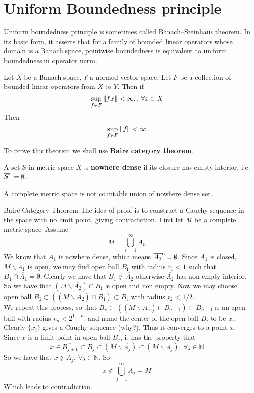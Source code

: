 \newpage
\section{Uniform Boundedness principle}
Uniform boundedness principle is sometimes called Banach–Steinhaus theorem. In its basic form, it asserts that for a family of bounded linear operators  whose domain is a Banach space, pointwise boundedness is equivalent to uniform boundedness in operator norm.

\begin{theorem}\rm\nextline
	Let $X$ be a Banach space, $Y$ a normed vector space. Let $F$ be a collection of bounded linear operators from $X$ to $Y$. Then if
	$$
		\sup_{f\in F}\left\|{fx}\right\|<\infty,,\,\forall x\in X
	$$
	Then
	$$
		\sup_{f\in F}\left\|{f}\right\|<\infty
	$$
\end{theorem}
To prove this theorem we shall use {\textbf{Baire category theorem}}.

\begin{definition}\rm\nextline
	A set $S$ in metric space $X$ is {\bf nowhere dense} if its closure has empty interior. i.e. $\overline{S}\strut^\mathrm{o}=\emptyset$.
\end{definition}

\begin{theorem}\rm\nextline
	A complete metric space is not countable union of nowhere dense set.
\begin{pf}{Baire Category Theorem}{}
	The idea of proof is to construct a Cauchy sequence in the space with no limit point, giving contradiction. First let $M$ be a complete metric space. Assume
	$$M=\bigcup_{n=1}^\infty A_n$$
	We know that $A_1$ is nowhere dense, which means $\overline{A_1}\strut^\mathrm{o}=\emptyset$. Since $\overline{A_1}$ is closed, $M\backslash \overline{A_1}$ is open, we may find open ball $B_1$ with radius $r_1<1$ such that $B_1\cap\overline{A_1}=\emptyset$. Clearly we have that $B_1\not\subset\overline{A_2}$ otherwise $\overline{A_2}$ has non-empty interior. So we have that $(M\backslash\overline{A_2})\cap B_1$ is open and non empty. Now we may choose open ball $B_2\subset((M\backslash\overline{A_2})\cap B_1)\subset B_1$ with radius $r_2<1/2$. \\
	We repeat this process, so that $B_n\subset((M\backslash\overline{A_n})\cap B_{n-1})\subset B_{n-1}$ is an  open ball with radius $r_n<2^{1-n}$. and name the center of the open ball $B_i$ to be $x_i$. Clearly $\{x_i\}$ gives a Cauchy sequence (why?). Thus it converges to a point $x$. Since $x$ is a limit point in open ball $B_j$, it has  the property that
	$$x\in \overline{B_{j+1}}\subset B_j\subset (M\backslash\overline{A_j})\subset(M\backslash A_j),\,\forall j\in\mathbb{N}$$
	So we have that $x\not\in A_j,\,\forall j\in\mathbb{N}$.
	So
	$$
		x\not\in \bigcup_{j=1}^{\infty}A_j=M
	$$
	Which leads to contradiction.
	\end{pf}
\end{theorem}

